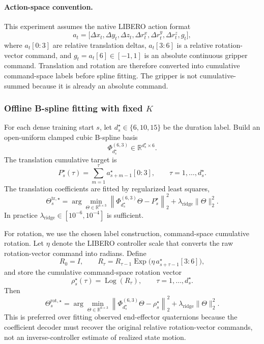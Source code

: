 \documentclass[10pt,twocolumn,letterpaper]{article}
\begin{document}
\paragraph{Action-space convention.}
This experiment assumes the native LIBERO action format
\begin{equation}
a_t=\bigl[\Delta x_t,\Delta y_t,\Delta z_t,\Delta r^x_t,\Delta r^y_t,\Delta r^z_t,g_t\bigr],
\end{equation}
where $a_t[0\!:\!3]$ are relative translation deltas, $a_t[3\!:\!6]$ is a relative rotation-vector command, and $g_t=a_t[6]\in[-1,1]$ is an absolute continuous gripper command. Translation and rotation are therefore converted into cumulative command-space labels before spline fitting. The gripper is not cumulative-summed because it is already an absolute command.

\subsubsection*{Offline B-spline fitting with fixed $K$}
For each dense training start $s$, let $d_s^\star\in\{6,10,15\}$ be the duration label. Build an open-uniform clamped cubic B-spline basis
\begin{equation}
\Phi_{d_s^\star}^{(6,3)}\in\mathbb{R}^{d_s^\star\times 6}.
\end{equation}
The translation cumulative target is
\begin{equation}
P_s^\star(\tau)=\sum_{m=1}^{\tau}a_{s+m-1}^{\star}[0\!:\!3],
\qquad \tau=1,\ldots,d_s^\star.
\end{equation}
The translation coefficients are fitted by regularized least squares,
\begin{equation}
\Theta_s^{\mathrm{tr},\star}
=\arg\min_{\Theta\in\mathbb{R}^{6\times3}}
\left\|\Phi_{d_s^\star}^{(6,3)}\Theta-P_s^\star\right\|_2^2
+\lambda_{\mathrm{ridge}}\|\Theta\|_2^2.
\end{equation}
In practice $\lambda_{\mathrm{ridge}}\in[10^{-6},10^{-4}]$ is sufficient.

For rotation, we use the chosen label construction, command-space cumulative rotation. Let $\eta$ denote the LIBERO controller scale that converts the raw rotation-vector command into radians. Define
\begin{equation}
R_0=I,
\qquad
R_\tau=R_{\tau-1}\operatorname{Exp}\bigl(\eta\,a_{s+\tau-1}^{\star}[3\!:\!6]\bigr),
\end{equation}
and store the cumulative command-space rotation vector
\begin{equation}
\rho_s^\star(\tau)=\operatorname{Log}(R_\tau),
\qquad \tau=1,\ldots,d_s^\star.
\end{equation}
Then
\begin{equation}
\Theta_s^{\mathrm{rot},\star}
=\arg\min_{\Theta\in\mathbb{R}^{6\times3}}
\left\|\Phi_{d_s^\star}^{(6,3)}\Theta-\rho_s^\star\right\|_2^2
+\lambda_{\mathrm{ridge}}\|\Theta\|_2^2.
\end{equation}
This is preferred over fitting observed end-effector quaternions because the coefficient decoder must recover the original relative rotation-vector commands, not an inverse-controller estimate of realized state motion.
\end{document}
